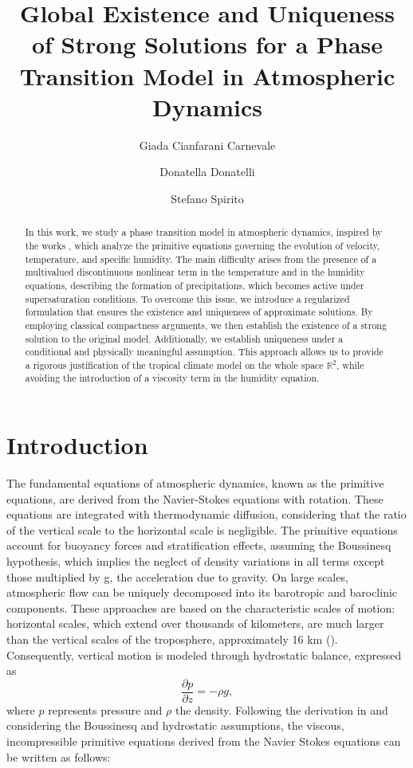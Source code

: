\documentclass[11pt, a4paper, article,reqno,]{amsart}
\title[\empty]{Global Existence and Uniqueness of Strong Solutions for a Phase Transition Model in Atmospheric Dynamics}
\author[G. Cianfarani Carnevale]{Giada Cianfarani Carnevale}
\author[D. Donatelli]{Donatella Donatelli}
\author[S. Spirito]{Stefano Spirito}
\theoremstyle{remark}
\numberwithin{equation}{section}
\begin{document}
\begin{abstract}
   In this work, we study a phase transition model in atmospheric dynamics, inspired by the works \cite{CZ, LT, LT2}, which analyze the primitive equations governing the evolution of velocity, temperature, and specific humidity. The main difficulty arises from the presence of a multivalued discontinuous nonlinear term in the temperature and in the humidity equations, describing the formation of precipitations, which becomes active under supersaturation conditions. To overcome this issue, we introduce a regularized formulation that ensures the existence and uniqueness of approximate solutions. By employing classical compactness arguments, we then establish the existence of a strong solution to the original model. Additionally, we establish uniqueness under a conditional and physically meaningful assumption. This approach allows us to provide a rigorous justification of the tropical climate model on the whole space $\mathbb{R}^2$, while avoiding the introduction of a viscosity term in the humidity equation.
\end{abstract}

\maketitle





\section{Introduction}\label{sec:intro}

The fundamental equations of atmospheric dynamics, known as the primitive equations, are derived from the Navier-Stokes equations with rotation. These equations are integrated with thermodynamic diffusion, considering that the ratio of the vertical scale to the horizontal scale is negligible. The primitive equations account for buoyancy forces and stratification effects, assuming the Boussinesq hypothesis, which implies the neglect of density variations in all terms except those multiplied by g, the acceleration due to gravity. On large scales, atmospheric flow can be uniquely decomposed into its barotropic and baroclinic components. These approaches are based on the characteristic scales of motion: horizontal scales, which extend over thousands of kilometers, are much larger than the vertical scales of the troposphere, approximately 16 km (\cite{KM}). Consequently, vertical motion is modeled through hydrostatic balance, expressed as 
\[
\frac{\partial p}{\partial z} = -\rho g,
\]
where \( p \) represents pressure and \( \rho \) the density. Following the derivation in \cite{KM} and considering the Boussinesq and hydrostatic assumptions, the viscous, incompressible primitive equations derived from the Navier Stokes equations can be written as follows:
\end{document}
